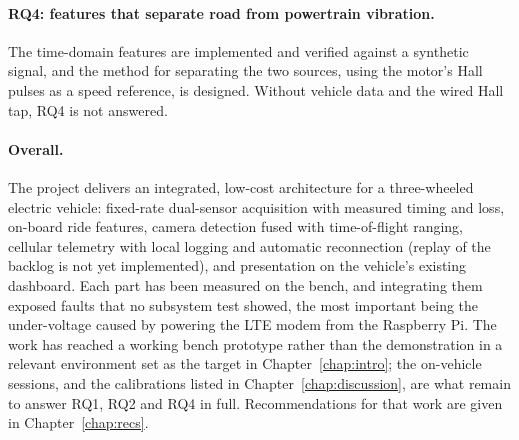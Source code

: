 \paragraph{RQ4: features that separate road from powertrain vibration.} The time-domain features are implemented and verified against a synthetic signal, and the method for separating the two sources, using the motor's Hall pulses as a speed reference, is designed. Without vehicle data and the wired Hall tap, RQ4 is not answered.

\paragraph{Overall.} The project delivers an integrated, low-cost architecture for a three-wheeled electric vehicle: fixed-rate dual-sensor acquisition with measured timing and loss, on-board ride features, camera detection fused with time-of-flight ranging, cellular telemetry with local logging and automatic reconnection (replay of the backlog is not yet implemented), and presentation on the vehicle's existing dashboard. Each part has been measured on the bench, and integrating them exposed faults that no subsystem test showed, the most important being the under-voltage caused by powering the LTE modem from the Raspberry Pi. The work has reached a working bench prototype rather than the demonstration in a relevant environment set as the target in Chapter~\ref{chap:intro}; the on-vehicle sessions, and the calibrations listed in Chapter~\ref{chap:discussion}, are what remain to answer RQ1, RQ2 and RQ4 in full. Recommendations for that work are given in Chapter~\ref{chap:recs}.
